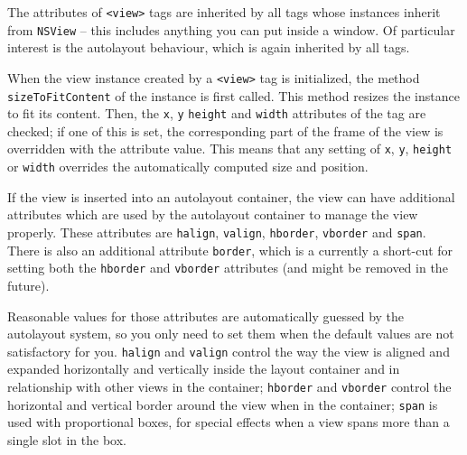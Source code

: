 The attributes of \texttt{<view>} tags are inherited by all tags whose
instances inherit from \texttt{NSView} -- this includes anything you
can put inside a window.  Of particular interest is the autolayout
behaviour, which is again inherited by all tags.

When the view instance created by a \texttt{<view>} tag is
initialized, the method \texttt{sizeToFitContent} of the instance is
first called.  This method resizes the instance to fit its content.
Then, the \texttt{x}, \texttt{y} \texttt{height} and \texttt{width}
attributes of the tag are checked; if one of this is set, the
corresponding part of the frame of the view is overridden with the
attribute value.  This means that any setting of \texttt{x}, \texttt{y},
\texttt{height} or \texttt{width} overrides the automatically computed
size and position.

If the view is inserted into an autolayout container, the view can
have additional attributes which are used by the autolayout container
to manage the view properly.  These attributes are \texttt{halign},
\texttt{valign}, \texttt{hborder}, \texttt{vborder} and \texttt{span}.  
There is also an additional attribute \texttt{border}, which is a
currently a short-cut for setting both the \texttt{hborder} and
\texttt{vborder} attributes (and might be removed in the future).

Reasonable values for those attributes are automatically guessed by
the autolayout system, so you only need to set them when the default
values are not satisfactory for you.  \texttt{halign} and
\texttt{valign} control the way the view is aligned and expanded 
horizontally and vertically inside the layout container and in
relationship with other views in the container; \texttt{hborder} and
\texttt{vborder} control the horizontal and vertical border around the
view when in the container; \texttt{span} is used with proportional
boxes, for special effects when a view spans more than a single slot
in the box.

